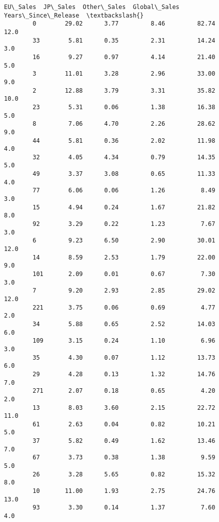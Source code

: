 \documentclass[11pt]{article}
\begin{document}
\begin{Verbatim}[commandchars=\\\{\}]
              EU\_Sales  JP\_Sales  Other\_Sales  Global\_Sales  Years\_Since\_Release  \textbackslash{}
        0        29.02      3.77         8.46         82.74                 12.0   
        33        5.81      0.35         2.31         14.24                  3.0   
        16        9.27      0.97         4.14         21.40                  5.0   
        3        11.01      3.28         2.96         33.00                  9.0   
        2        12.88      3.79         3.31         35.82                 10.0   
        23        5.31      0.06         1.38         16.38                  5.0   
        8         7.06      4.70         2.26         28.62                  9.0   
        44        5.81      0.36         2.02         11.98                  4.0   
        32        4.05      4.34         0.79         14.35                  5.0   
        49        3.37      3.08         0.65         11.33                  4.0   
        77        6.06      0.06         1.26          8.49                  3.0   
        15        4.94      0.24         1.67         21.82                  8.0   
        92        3.29      0.22         1.23          7.67                  3.0   
        6         9.23      6.50         2.90         30.01                 12.0   
        14        8.59      2.53         1.79         22.00                  9.0   
        101       2.09      0.01         0.67          7.30                  3.0   
        7         9.20      2.93         2.85         29.02                 12.0   
        221       3.75      0.06         0.69          4.77                  2.0   
        34        5.88      0.65         2.52         14.03                  6.0   
        109       3.15      0.24         1.10          6.96                  3.0   
        35        4.30      0.07         1.12         13.73                  6.0   
        29        4.28      0.13         1.32         14.76                  7.0   
        271       2.07      0.18         0.65          4.20                  2.0   
        13        8.03      3.60         2.15         22.72                 11.0   
        61        2.63      0.04         0.82         10.21                  5.0   
        37        5.82      0.49         1.62         13.46                  7.0   
        67        3.73      0.38         1.38          9.59                  5.0   
        26        3.28      5.65         0.82         15.32                  8.0   
        10       11.00      1.93         2.75         24.76                 13.0   
        93        3.30      0.14         1.37          7.60                  4.0   

\end{Verbatim}
\end{document}
